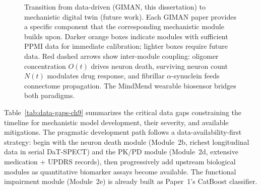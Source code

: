 \begin{figure}[t]
\caption{Transition from data-driven (GIMAN, this dissertation) to mechanistic digital twin (future work). Each GIMAN paper provides a specific component that the corresponding mechanistic module builds upon. Darker orange boxes indicate modules with sufficient PPMI data for immediate calibration; lighter boxes require future data. Red dashed arrows show inter-module coupling: oligomer concentration $O(t)$ drives neuron death, surviving neuron count $N(t)$ modulates drug response, and fibrillar $\alpha$-synuclein feeds connectome propagation. The MindMend wearable biosensor bridges both paradigms.}
\label{fig:mech-transition}
\end{figure}

Table~\ref{tab:data-gaps-ch9} summarizes the critical data gaps constraining the timeline for mechanistic model development, their severity, and available mitigations. The pragmatic development path follows a data-availability-first strategy: begin with the neuron death module (Module~2b, richest longitudinal data in serial DaT-SPECT) and the PK/PD module (Module~2d, extensive medication + UPDRS records), then progressively add upstream biological modules as quantitative biomarker assays become available. The functional impairment module (Module~2e) is already built as Paper~1's CatBoost classifier.

